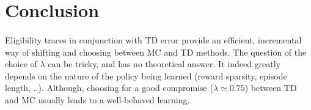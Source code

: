 \documentclass[a4paper]{article}
\begin{document}
	\section{Conclusion}
	{
		\paragraph{} Eligibility traces in conjunction with TD error provide an efficient, incremental way of shifting and choosing between MC and TD methods. The question of the choice of $\lambda$ can be tricky, and has no theoretical answer. It indeed greatly depends on the nature of the policy being learned (reward sparsity, episode length, ..). Although, choosing for a good compromise ($\lambda\simeq 0.75$) between TD and MC usually leads to a well-behaved learning. 
	}
	
	
\end{document}
